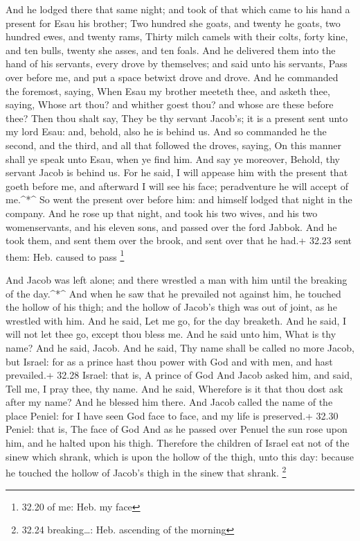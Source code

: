  And he lodged there that same night; and took of that
which came to his hand a present for Esau his brother;  Two
hundred she goats, and twenty he goats, two hundred ewes, and twenty
rams,  Thirty milch camels with their colts, forty kine,
and ten bulls, twenty she asses, and ten foals.  And he
delivered them into the hand of his servants, every drove by themselves;
and said unto his servants, Pass over before me, and put a space betwixt
drove and drove.  And he commanded the foremost, saying,
When Esau my brother meeteth thee, and asketh thee, saying, Whose art
thou? and whither goest thou? and whose are these before thee?
 Then thou shalt say, They be thy servant Jacob's; it is a
present sent unto my lord Esau: and, behold, also he is behind us.
 And so commanded he the second, and the third, and all
that followed the droves, saying, On this manner shall ye speak unto
Esau, when ye find him.  And say ye moreover, Behold, thy
servant Jacob is behind us. For he said, I will appease him with the
present that goeth before me, and afterward I will see his face;
peradventure he will accept of me.\^{}*\^{}  So went the
present over before him: and himself lodged that night in the company.
 And he rose up that night, and took his two wives, and his
two womenservants, and his eleven sons, and passed over the ford Jabbok.
 And he took them, and sent them over the brook, and sent
over that he had.+ 32.23 sent them: Heb. caused to pass \footnote{32.20
  of me: Heb. my face}

 And Jacob was left alone; and there wrestled a man with
him until the breaking of the day.\^{}*\^{}  And when he
saw that he prevailed not against him, he touched the hollow of his
thigh; and the hollow of Jacob's thigh was out of joint, as he wrestled
with him.  And he said, Let me go, for the day breaketh.
And he said, I will not let thee go, except thou bless me. 
And he said unto him, What is thy name? And he said, Jacob.
 And he said, Thy name shall be called no more Jacob, but
Israel: for as a prince hast thou power with God and with men, and hast
prevailed.+ 32.28 Israel: that is, A prince of God  And
Jacob asked him, and said, Tell me, I pray thee, thy name. And he said,
Wherefore is it that thou dost ask after my name? And he blessed him
there.  And Jacob called the name of the place Peniel: for
I have seen God face to face, and my life is preserved.+ 32.30 Peniel:
that is, The face of God  And as he passed over Penuel the
sun rose upon him, and he halted upon his thigh.  Therefore
the children of Israel eat not of the sinew which shrank, which is upon
the hollow of the thigh, unto this day: because he touched the hollow of
Jacob's thigh in the sinew that shrank. \footnote{32.24 breaking\ldots:
  Heb. ascending of the morning}

